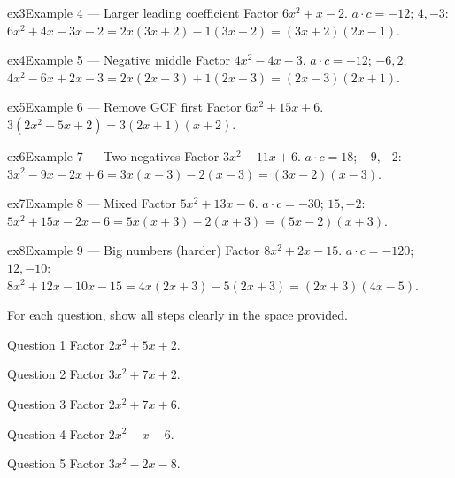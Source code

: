 \documentclass[11pt]{article}
\begin{document}
\begin{example}{ex3}{Example 4 --- Larger leading coefficient}
Factor $6x^2+x-2$.
\soln $a\cdot c=-12$; $4,-3$: $6x^2+4x-3x-2=2x(3x+2)-1(3x+2)=(3x+2)(2x-1).$
\end{example}

\begin{example}{ex4}{Example 5 --- Negative middle}
Factor $4x^2-4x-3$.
\soln $a\cdot c=-12$; $-6,2$: $4x^2-6x+2x-3=2x(2x-3)+1(2x-3)=(2x-3)(2x+1).$
\end{example}

\begin{example}{ex5}{Example 6 --- Remove GCF first}
Factor $6x^2+15x+6$.
\soln $3(2x^2+5x+2)=3(2x+1)(x+2).$
\end{example}

\begin{example}{ex6}{Example 7 --- Two negatives}
Factor $3x^2-11x+6$.
\soln $a\cdot c=18$; $-9,-2$: $3x^2-9x-2x+6=3x(x-3)-2(x-3)=(3x-2)(x-3).$
\end{example}

\begin{example}{ex7}{Example 8 --- Mixed}
Factor $5x^2+13x-6$.
\soln $a\cdot c=-30$; $15,-2$: $5x^2+15x-2x-6=5x(x+3)-2(x+3)=(5x-2)(x+3).$
\end{example}

\begin{example}{ex8}{Example 9 --- Big numbers (harder)}
Factor $8x^2+2x-15$.
\soln $a\cdot c=-120$; $12,-10$: $8x^2+12x-10x-15=4x(2x+3)-5(2x+3)=(2x+3)(4x-5).$
\end{example}

\clearpage
{}
For each question, show all steps clearly in the space provided.

\begin{qbox}{Question 1}
Factor $2x^2+5x+2$.\workspace{2.0cm}
\end{qbox}

\begin{qbox}{Question 2}
Factor $3x^2+7x+2$.\workspace{2.0cm}
\end{qbox}

\begin{qbox}{Question 3}
Factor $2x^2+7x+6$.\workspace{2.0cm}
\end{qbox}

\begin{qbox}{Question 4}
Factor $2x^2-x-6$.\workspace{2.0cm}
\end{qbox}

\begin{qbox}{Question 5}
Factor $3x^2-2x-8$.\workspace{2.2cm}
\end{qbox}
\end{document}

